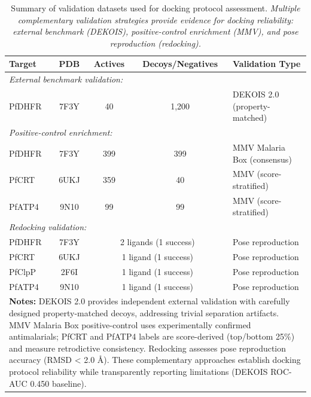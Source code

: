 
\begin{table}[!htbp]
\centering
\caption{Summary of validation datasets used for docking protocol assessment. \textit{Multiple complementary validation strategies provide evidence for docking reliability: external benchmark (DEKOIS), positive-control enrichment (MMV), and pose reproduction (redocking).}}
\label{tab:sm_validation_datasets}
\small
\begin{tabular}{lcccp{5cm}}
\toprule
\textbf{Target} & \textbf{PDB} & \textbf{Actives} & \textbf{Decoys/Negatives} & \textbf{Validation Type} \\
\midrule
\multicolumn{5}{l}{\textit{External benchmark validation:}} \\
PfDHFR & 7F3Y & 40 & 1,200 & DEKOIS 2.0 (property-matched) \\
\midrule
\multicolumn{5}{l}{\textit{Positive-control enrichment:}} \\
PfDHFR & 7F3Y & 399 & 399 & MMV Malaria Box (consensus) \\
PfCRT & 6UKJ & 359 & 40 & MMV (score-stratified) \\
PfATP4 & 9N10 & 99 & 99 & MMV (score-stratified) \\
\midrule
\multicolumn{5}{l}{\textit{Redocking validation:}} \\
PfDHFR & 7F3Y & \multicolumn{2}{c}{2 ligands (1 success)} & Pose reproduction \\
PfCRT & 6UKJ & \multicolumn{2}{c}{1 ligand (1 success)} & Pose reproduction \\
PfClpP & 2F6I & \multicolumn{2}{c}{1 ligand (1 success)} & Pose reproduction \\
PfATP4 & 9N10 & \multicolumn{2}{c}{1 ligand (1 success)} & Pose reproduction \\
\bottomrule
\multicolumn{5}{p{14cm}}{
\noindent\textbf{Notes:} DEKOIS 2.0 provides independent external validation with carefully designed property-matched decoys, addressing trivial separation artifacts. MMV Malaria Box positive-control uses experimentally confirmed antimalarials; PfCRT and PfATP4 labels are score-derived (top/bottom 25\%) and measure retrodictive consistency. Redocking assesses pose reproduction accuracy (RMSD < 2.0 \si{\angstrom}). These complementary approaches establish docking protocol reliability while transparently reporting limitations (DEKOIS ROC-AUC 0.450 baseline).}
\end{tabular}
\end{table}
